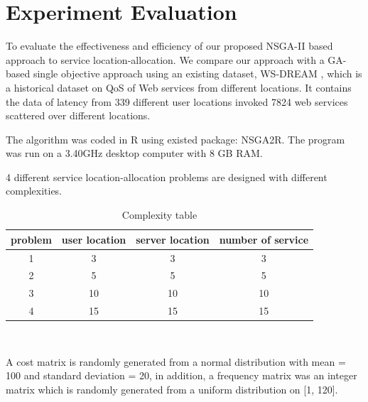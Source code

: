 \documentclass{llncs}
\begin{document}
\section{Experiment Evaluation}
\label{sec:experiment}
To evaluate the effectiveness and efficiency of our proposed NSGA-II based approach to service location-allocation. We compare our approach with a GA-based single objective approach
using an existing dataset, WS-DREAM \cite{6076756} \cite{5552800}, which is a historical dataset on QoS of Web services from different locations. It contains the data of latency
from 339 different user locations invoked 7824 web services scattered over different locations.

The algorithm was coded in R \cite{Morandat:2012:EDR:2367163.2367172} using existed package: NSGA2R. The program was run on a 3.40GHz 
desktop computer with 8 GB RAM.

4 different service location-allocation problems are designed with different complexities.
\begin{table}[h]
{\centering
	\caption{Complexity table}
	\begin{tabular}{|c|c|c|c|}
		\hline
		\multicolumn{1}{|l|}{problem} & \multicolumn{1}{l|}{user location} & \multicolumn{1}{l|}{server location} & \multicolumn{1}{l|}{number of service} \\\hline
		1                             & 3                                  & 3                                    & 3                                      \\\hline
		2                             & 5                                  & 5                                    & 5                                      \\\hline
		3                             & 10                                 & 10                                   & 10                                     \\\hline
		4                             & 15                                 & 15                                   & 15                                    \\
		\hline
	\end{tabular}
\\}
\end{table}

	A cost matrix is randomly generated from a normal distribution with mean = 100 and standard deviation = 20, in addition, a frequency matrix was an integer matrix which is randomly generated from a uniform distribution on [1, 120].
\end{document}
